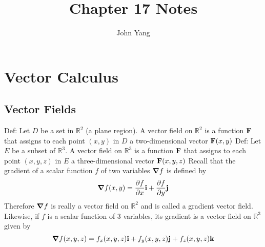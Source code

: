 \documentclass{article}
\title{Chapter 17 Notes} %
\author{John Yang}
\begin{document}
    \maketitle
    \tableofcontents
    \section{Vector Calculus} %
    \subsection{Vector Fields} %
    \begin{outline}
        \1 Def: Let $D$ be a set in \(\mathbb R^2\) (a plane region). A vector field on \(\mathbb R^2\) is a function \(\vb F\) that assigns to each point \((x,y)\) in $D$ a two-dimensional vector \(\vb F(x,y)\)
        \1 Def: Let $E$ be a subset of \(\mathbb R^3\). A vector field on \(\mathbb R^3\) is a function \(\vb F\) that assigns to each point \((x,y,z)\) in $E$ a three-dimensional vector \(\vb F(x,y,z)\)
        \1 Recall that the gradient of a scalar function $f$ of two variables \(\grad f\) is defined by \[\grad f(x,y)=\pdv{f}{x}\vb i+\pdv{f}{y}\vb j\] Therefore \(\grad f\) is really a vector field on \(\mathbb R^2\) and is called a gradient vector field. Likewise, if $f$ is a scalar function of 3 variables, its gradient is a vector field on \(\mathbb R^3\) given by \[\grad f(x,y,z)=f_x(x,y,z)\vb i+f_y(x,y,z)\vb j+f_z(x,y,z)\vb k\]
        
    \end{outline}
\end{document}
